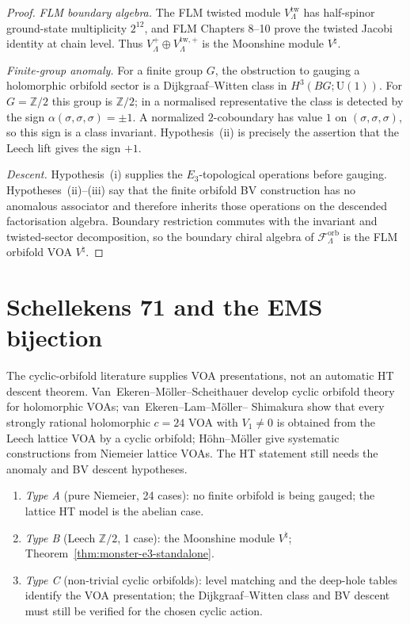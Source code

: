 \documentclass[11pt]{amsart}
\theoremstyle{definition}
\theoremstyle{remark}
\providecommand{\Z}{\mathbb{Z}}
\providecommand{\cF}{\mathcal{F}}
\begin{document}
\begin{proof}
\emph{FLM boundary algebra.} The FLM twisted
module $V_\Lambda^{\mathrm{tw}}$ has half-spinor ground-state
multiplicity $2^{12}$, and FLM Chapters 8--10 prove the twisted
Jacobi identity at chain level. Thus
$V_\Lambda^+ \oplus V_\Lambda^{\mathrm{tw},+}$ is the Moonshine module
$V^\natural$.

\emph{Finite-group anomaly.} For a finite group $G$, the obstruction
to gauging a holomorphic orbifold sector is a Dijkgraaf--Witten class
in $H^3(BG;\mathrm{U}(1))$. For $G=\Z/2$ this group is $\Z/2$; in a
normalised representative the class is detected by the sign
$\alpha(\sigma,\sigma,\sigma)=\pm 1$. A normalized $2$-coboundary has
value $1$ on $(\sigma,\sigma,\sigma)$, so this sign is a class
invariant. Hypothesis~(ii) is precisely the assertion that the Leech
lift gives the sign $+1$.

\emph{Descent.} Hypothesis~(i) supplies the $E_3$-topological
operations before gauging. Hypotheses~(ii)--(iii) say that the finite
orbifold BV construction has no anomalous associator and therefore
inherits those operations on the descended factorisation algebra.
Boundary restriction commutes with the invariant and twisted-sector
decomposition, so the boundary chiral algebra of
$\cF_\Lambda^{\mathrm{orb}}$ is the FLM orbifold VOA $V^\natural$.
\end{proof}

\section{Schellekens 71 and the EMS bijection}

The cyclic-orbifold literature supplies VOA presentations, not an
automatic HT descent theorem. Van~Ekeren--M\"oller--Scheithauer develop
cyclic orbifold theory for holomorphic VOAs; van~Ekeren--Lam--M\"oller--
Shimakura show that every strongly rational holomorphic
$c=24$ VOA with $V_1\ne0$ is obtained from the Leech lattice VOA by a
cyclic orbifold; H\"ohn--M\"oller give systematic constructions from
Niemeier lattice VOAs. The HT statement still needs the anomaly and BV
descent hypotheses.

\begin{enumerate}[label=(\alph*)]
\item \emph{Type A} (pure Niemeier, 24 cases): no finite orbifold
is being gauged; the lattice HT model is the abelian case.
\item \emph{Type B} (Leech $\Z/2$, 1 case): the Moonshine module
$V^\natural$; Theorem~\ref{thm:monster-e3-standalone}.
\item \emph{Type C} (non-trivial cyclic orbifolds): level matching and
the deep-hole tables identify the VOA presentation; the
Dijkgraaf--Witten class and BV descent must still be verified for the
chosen cyclic action.
\end{enumerate}
\end{document}
